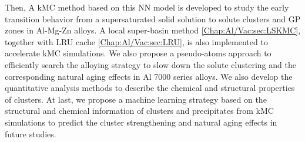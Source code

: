 Then, A \ac{kMC} method based on this \ac{NN} model is developed to study the early transition behavior from a supersaturated solid solution to solute clusters and \acf{GP} zones in Al-Mg-Zn alloys. A local super-basin method  \ref{Chap:Al/Vac:sec:LSKMC}, together with \ac{LRU} cache \ref{Chap:Al/Vac:sec:LRU}, is also implemented to accelerate \ac{kMC} simulations. We also propose a pseudo-atoms approach to efficiently search the alloying strategy to slow down the solute clustering and the corresponding natural aging effects in Al 7000 series alloys. We also develop the quantitative analysis methods to describe the chemical and structural properties of clusters. At last, we propose a machine learning strategy based on the structural and chemical information of clusters and precipitates from \ac{kMC} simulations to predict the cluster strengthening and natural aging effects in future studies.